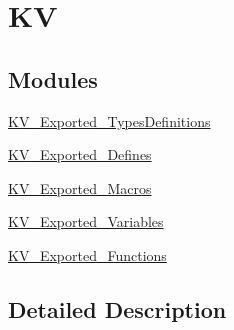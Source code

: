 \hypertarget{group___k_v}{}\section{KV}
\label{group___k_v}
\subsection*{Modules}
\begin{DoxyCompactItemize}
\item 
\mbox{\hyperlink{group___k_v___exported___types_definitions}{K\+V\+\_\+\+Exported\+\_\+\+Types\+Definitions}}
\item 
\mbox{\hyperlink{group___k_v___exported___defines}{K\+V\+\_\+\+Exported\+\_\+\+Defines}}
\item 
\mbox{\hyperlink{group___k_v___exported___macros}{K\+V\+\_\+\+Exported\+\_\+\+Macros}}
\item 
\mbox{\hyperlink{group___k_v___exported___variables}{K\+V\+\_\+\+Exported\+\_\+\+Variables}}
\item 
\mbox{\hyperlink{group___k_v___exported___functions}{K\+V\+\_\+\+Exported\+\_\+\+Functions}}
\end{DoxyCompactItemize}


\subsection{Detailed Description}
